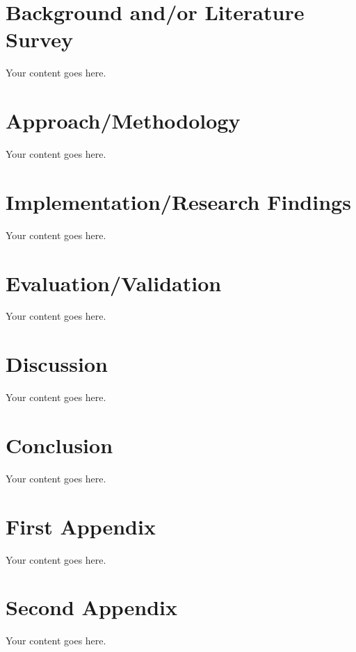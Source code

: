 \documentclass[12pt,lot,lof]{quthesis}
\begin{document}
\chapter{Background and/or Literature Survey}
Your content goes here.

\chapter{Approach/Methodology}
Your content goes here.

\chapter{Implementation/Research Findings}
Your content goes here.

\chapter{Evaluation/Validation}
Your content goes here.

\chapter{Discussion}
Your content goes here.

\chapter{Conclusion}
Your content goes here.

{
\singlespacing


\cleardoublepage
\ifdefined{}
\else
\fi
{}


}


\begin{appendices}



\chapter{First Appendix}
Your content goes here.

\chapter{Second Appendix}
Your content goes here.

\end{appendices}
\end{document}
